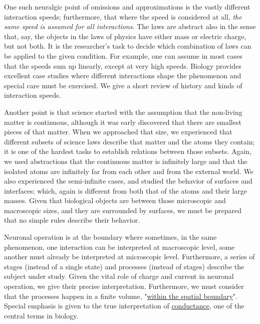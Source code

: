 One such neuralgic point of omissions and approximations is  the vastly different
{interaction speeds};
furthermore, that where the speed is considered at all, \textit{the same speed is assumed for all interactions}.
The laws are abstract also in the sense that, say, the objects in the laws of physics have either mass or
electric charge, but not both. It is the researcher's task to decide
which combination of laws
can be applied to the given condition. For example, one can assume in most cases
that the speeds sum up linearly, except at very high speeds.
Biology provides excellent case studies where different interactions
shape the phenomenon and special care must be exercised.
We give a short review of 
{history and kinds of interaction speeds}.

Another point is that science started with the assumption that
the non-living matter is continuous, although it was early
discovered that there are smallest pieces of that matter.
When we approached that size, we experienced that different subsets
of science laws describe that matter and the atoms they contain;
it is one of the hardest tasks to establish relations between
those subsets. Again, we used abstractions that the 
continuous matter is infinitely large and that the isolated
atoms are infinitely far from each other and from the external world. We also experienced the semi-infinite cases, and studied
the behavior of surfaces and interfaces; which, again is different from both that of the atoms and their large masses. Given that biological objects are between those microscopic and macroscopic sizes, and they are surrounded by surfaces, we must be prepared that no simple rules describe their behavior.

Neuronal operation is at the boundary where sometimes, in the same phenomenon,
one interaction can be interpreted at macroscopic level, some another
must already be interpreted at microscopic level.
Furthermore, a series of stages (instead of a single state) and
processes (instead of stages) describe the subject under study.
Given the vital role of %
{charge and current} in neuronal operation,
we give their precise interpretation.
Furthermore, we must consider that the processes happen in a finite volume,
"\hyperlink{ChangingResources}
{within the spatial boundary}".
Special emphasis is given to the true interpretation of 
\hyperlink{electric_conductance}
{conductance},
one of the central terms in biology.


